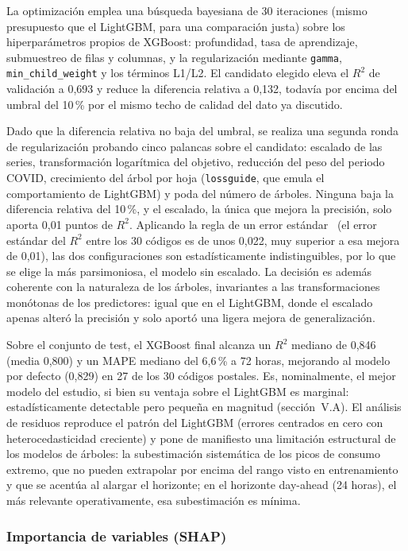 \documentclass[12pt, a4paper]{article}
\begin{document}
La optimización emplea una búsqueda bayesiana de 30 iteraciones (mismo presupuesto que el LightGBM, para una comparación justa) sobre los hiperparámetros propios de XGBoost: profundidad, tasa de aprendizaje, submuestreo de filas y columnas, y la regularización mediante \texttt{gamma}, \texttt{min\_child\_weight} y los términos L1/L2. El candidato elegido eleva el $R^2$ de validación a 0,693 y reduce la diferencia relativa a 0,132, todavía por encima del umbral del 10\,\% por el mismo techo de calidad del dato ya discutido.

Dado que la diferencia relativa no baja del umbral, se realiza una segunda ronda de regularización probando cinco palancas sobre el candidato: escalado de las series, transformación logarítmica del objetivo, reducción del peso del periodo COVID, crecimiento del árbol por hoja (\texttt{lossguide}, que emula el comportamiento de LightGBM) y poda del número de árboles. Ninguna baja la diferencia relativa del 10\,\%, y el escalado, la única que mejora la precisión, solo aporta 0,01 puntos de $R^2$. Aplicando la regla de un error estándar~\cite{hastie2009} (el error estándar del $R^2$ entre los 30 códigos es de unos 0,022, muy superior a esa mejora de 0,01), las dos configuraciones son estadísticamente indistinguibles, por lo que se elige la más parsimoniosa, el modelo sin escalado. La decisión es además coherente con la naturaleza de los árboles, invariantes a las transformaciones monótonas de los predictores: igual que en el LightGBM, donde el escalado apenas alteró la precisión y solo aportó una ligera mejora de generalización.

Sobre el conjunto de test, el XGBoost final alcanza un $R^2$ mediano de 0,846 (media 0,800) y un MAPE mediano del 6,6\,\% a 72 horas, mejorando al modelo por defecto (0,829) en 27 de los 30 códigos postales. Es, nominalmente, el mejor modelo del estudio, si bien su ventaja sobre el LightGBM es marginal: estadísticamente detectable pero pequeña en magnitud (sección~V.A). El análisis de residuos reproduce el patrón del LightGBM (errores centrados en cero con heterocedasticidad creciente) y pone de manifiesto una limitación estructural de los modelos de árboles: la subestimación sistemática de los picos de consumo extremo, que no pueden extrapolar por encima del rango visto en entrenamiento y que se acentúa al alargar el horizonte; en el horizonte day-ahead (24 horas), el más relevante operativamente, esa subestimación es mínima.

\subsubsection{Importancia de variables (SHAP)}
\end{document}
